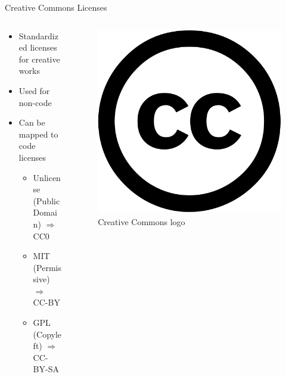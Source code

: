 \documentclass[compress,aspectratio=169]{beamer}
\begin{document}
  \begin{frame}{Creative Commons Licenses}
    \begin{columns}
      \begin{column}{0.6\textwidth}
		    \begin{itemize}
		    	\item Standardized licenses for creative works
          \item Used for non-code
          \item Can be mapped to code licenses
            \begin{itemize}
              \item Unlicense (Public Domain) $\Rightarrow$ CC0
              \item MIT (Permissive) $\Rightarrow$ CC-BY
              \item GPL (Copyleft) $\Rightarrow$ CC-BY-SA
            \end{itemize}
		    \end{itemize}
      \end{column}
      \begin{column}{0.4\textwidth}
        \begin{figure}
          \includegraphics[width=\textwidth]{./assets/cc.png}
          \caption{Creative Commons logo \cite{gfonts}}
        \end{figure}
      \end{column}
    \end{columns}
	\end{frame}
\end{document}
